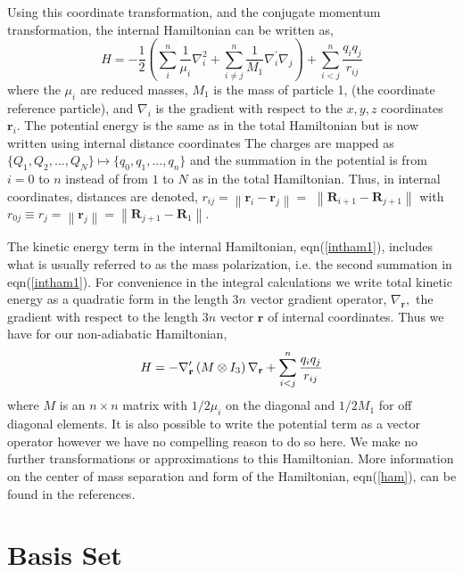 \documentclass[12pt,doublespace]{article}
\begin{document}
Using this coordinate transformation, and the conjugate momentum
transformation, the internal Hamiltonian can be written as, 
\begin{equation}
H=-\frac{1}{2}\left( \sum_{i}^{n}\frac{1}{\mu _{i}}\nabla
_{i}^{2}+\sum_{i\neq j}^{n}\frac{1}{M_{1}}\nabla _{i}^{\prime }\nabla
_{j}\right) +\sum_{i<j}^{n}\frac{q_{i}q_{j}}{r_{ij}}  \label{intham1}
\end{equation}
where the $\mu _{i}$ are reduced masses, $M_{1}$ is the mass of particle 1,
(the coordinate reference particle), and $\nabla _{i}$ is the gradient with
respect to the $x,y,z$ coordinates $\mathbf{r}_{i}$. The potential energy is
the same as in the total Hamiltonian but is now written using internal
distance coordinates The charges are mapped as $\{Q_{1},Q_{2},...,Q_{N}\}%
\mapsto \{q_{0},q_{1},...,q_{n}\}$ and the summation in the potential is
from $i=0$ to $n$ instead of from $1$ to $N$ as in the total Hamiltonian.
Thus, in internal coordinates, distances are denoted, $r_{ij}=\left\| 
\mathbf{r}_{i}-\mathbf{r}_{j}\right\| =$ $\left\| \mathbf{R}_{i+1}-\mathbf{R}%
_{j+1}\right\| \,\,$with\thinspace $r_{0j}\equiv r_{j}=\left\| \mathbf{r}%
_{j}\right\| =\left\| \mathbf{R}_{j+1}-\mathbf{R}_{1}\right\| .$

The kinetic energy term in the internal Hamiltonian, eqn(\ref{intham1}),
includes what is usually referred to as the mass polarization, i.e. the
second summation in eqn(\ref{intham1}). For convenience in the integral
calculations we write total kinetic energy as a quadratic form in the length 
$3n$ vector gradient operator, $\nabla _{\mathbf{r}},$ the gradient with
respect to the length $3n$ vector $\mathbf{r}$ of internal coordinates. Thus
we have for our non-adiabatic Hamiltonian, 
\begin{equation}
H=-\nabla _{\mathbf{r}}^{\prime }\left( M\otimes I_{3}\right) \nabla _{%
\mathbf{r}}+\sum_{i<j}^{n}\frac{q_{i}q_{j}}{r_{ij}}  \label{ham}
\end{equation}
where $M$ is an $n\times n$ matrix with $1/2\mu _{i}$ on the diagonal and $%
1/2M_{1}$ for off diagonal elements. It is also possible to write the
potential term as a vector operator\cite{Kinghorn95a} however we have no
compelling reason to do so here. We make no further transformations or
approximations to this Hamiltonian. More information on the center of mass
separation and form of the Hamiltonian, eqn(\ref{ham}), can be found in the
references\cite{Kinghorn93,Kinghorn95b}.\qquad\ 

\section{Basis Set}
\end{document}
